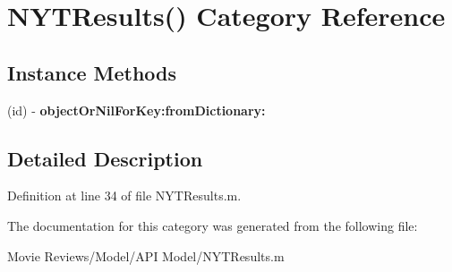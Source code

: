 \section{N\+Y\+T\+Results() Category Reference}
\label{category_n_y_t_results_07_08}
\subsection*{Instance Methods}
\begin{DoxyCompactItemize}
\item 
(id) -\/ {\bfseries object\+Or\+Nil\+For\+Key\+:from\+Dictionary\+:}\label{category_n_y_t_results_07_08_a29430c8bdad0b6c24443308467b36e25}

\end{DoxyCompactItemize}


\subsection{Detailed Description}


Definition at line 34 of file N\+Y\+T\+Results.\+m.



The documentation for this category was generated from the following file\+:\begin{DoxyCompactItemize}
\item 
Movie Reviews/\+Model/\+A\+P\+I Model/N\+Y\+T\+Results.\+m\end{DoxyCompactItemize}
